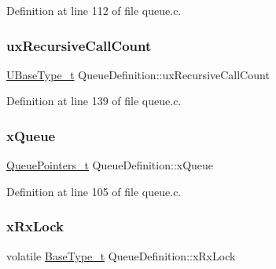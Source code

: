 Definition at line 112 of file queue.\+c.

\mbox{\label{struct_queue_definition_a2cf88e286477f6f89fe1009d722dc4cf}} 
\subsubsection{\texorpdfstring{ux\+Recursive\+Call\+Count}{uxRecursiveCallCount}}
{\footnotesize\ttfamily \hyperlink{externals_2freertos_2portable_2_g_c_c_2_a_r_m___c_m0_2portmacro_8h_a646f89d4298e4f5afd522202b11cb2e6}{U\+Base\+Type\+\_\+t} Queue\+Definition\+::ux\+Recursive\+Call\+Count}



Definition at line 139 of file queue.\+c.

\mbox{\label{struct_queue_definition_aea4a2daf33054ff6b535f158bd4007f0}} 
\subsubsection{\texorpdfstring{x\+Queue}{xQueue}}
{\footnotesize\ttfamily \hyperlink{externals_2freertos_2queue_8c_ad04ba6edfecdbdee6406cdd62a72671c}{Queue\+Pointers\+\_\+t} Queue\+Definition\+::x\+Queue}



Definition at line 105 of file queue.\+c.

\mbox{\label{struct_queue_definition_acfda1aacb3043fab24087782f996dc8b}} 
\subsubsection{\texorpdfstring{x\+Rx\+Lock}{xRxLock}}
{\footnotesize\ttfamily volatile \hyperlink{externals_2freertos_2portable_2_g_c_c_2_a_r_m___c_m0_2portmacro_8h_a46fb21e00ae0729d7515c0fbf2269796}{Base\+Type\+\_\+t} Queue\+Definition\+::x\+Rx\+Lock}



